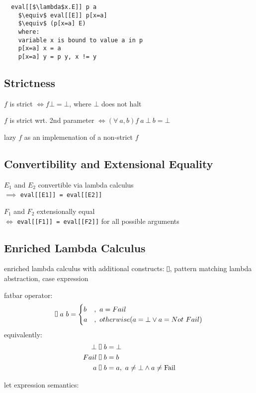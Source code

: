 \documentclass[8pt]{extarticle}
\newcommand*{\vrectangle}{{\setlength{\fboxsep}{0pt}\fbox{\phantom{l}}}}
\begin{document}
\begin{multicols*}{2}
\begin{lstlisting}
  eval[[$\lambda$x.E]] p a
    $\equiv$ eval[[E]] p[x=a]
    $\equiv$ (p[x=a] E)
    where:
    variable x is bound to value a in p
    p[x=a] x = a
    p[x=a] y = p y, x != y
\end{lstlisting}
  
\subsection{Strictness}

$f$ is strict $\iff f \bot = \bot$, where $\bot$ does not halt

$f$ is strict wrt. 2nd parameter $\iff (\forall\ a, b) f\ a\ \bot\ b = \bot$

lazy $f$ as an implemenation of a non-strict $f$

\subsection{Convertibility and Extensional Equality}

$E_1$ and $E_2$ convertible via lambda calculus\\
$\implies$ \verb|eval[[E1]] = eval[[E2]]|

$F_1$ and $F_2$ extensionally equal\\
$\iff$ \verb|eval[[F1]] = eval[[F2]]| for all possible arguments

  \subsection{Enriched Lambda Calculus}
  enriched lambda calculus with additional constructs: $\vrectangle$, pattern matching lambda abstraction, case expression
  
  fatbar operator:
  \begin{align*}
    \vrectangle\ a\ b = \begin{cases}
      b&,\ a = Fail\\
      a&,\ otherwise (a=\bot \vee a=Not\ Fail)
    \end{cases}
  \end{align*}
  equivalently:
\begin{align*}
  \bot\ &\vrectangle\ b = \bot\\
  Fail\ &\vrectangle\ b = b\\
  a\ &\vrectangle\ b = a,\ a \neq \bot \wedge a \neq \text{Fail}
\end{align*}

  let expression semantics:
  

\end{multicols*}
\end{document}
